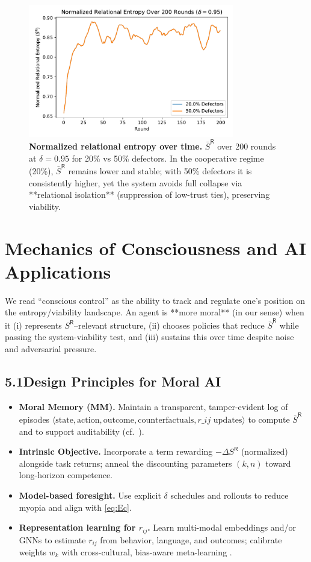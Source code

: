 \documentclass[11pt,a4paper]{article}
\begin{document}
\begin{figure}[t]
  \centering
  \includegraphics[width=0.80\textwidth]{entropy_chart.pdf}
  \caption{\textbf{Normalized relational entropy over time.}
  $\bar S^{\mathsf{R}}$ over 200 rounds at $\delta{=}0.95$ for 20\% vs 50\% defectors. In the cooperative regime (20\%), $\bar S^{\mathsf{R}}$ remains lower and stable; with 50\% defectors it is consistently higher, yet the system avoids full collapse via **relational isolation** (suppression of low-trust ties), preserving viability.}
  \label{fig:sr_over_time}
\end{figure}

\section{Mechanics of Consciousness and AI Applications}
We read “conscious control” as the ability to track and regulate one’s position on the entropy/viability landscape. An agent is **more moral** (in our sense) when it (i) represents $S^{\mathsf{R}}$–relevant structure, (ii) chooses policies that reduce $\bar S^{\mathsf{R}}$ while passing the system-viability test, and (iii) sustains this over time despite noise and adversarial pressure.

\subsection*{5.1\quad Design Principles for Moral AI}
\begin{itemize}
  \item \textbf{Moral Memory (MM).} Maintain a transparent, tamper-evident log of episodes \(\langle \text{state}, \text{action}, \text{outcome}, \text{counterfactuals}, r\_{ij}\text{ updates}\rangle\) to compute $\bar S^{\mathsf{R}}$ and to support auditability (cf.\ \cite{Amodei2016,IEEE2020}).
  \item \textbf{Intrinsic Objective.} Incorporate a term rewarding \(-\Delta S^{\mathsf{R}}\) (normalized) alongside task returns; anneal the discounting parameters $(k,n)$ toward long-horizon competence.
  \item \textbf{Model-based foresight.} Use explicit $\delta$ schedules and rollouts to reduce myopia and align with \eqref{eq:Ec}.
  \item \textbf{Representation learning for \(r_{ij}\).} Learn multi-modal embeddings and/or GNNs to estimate $r_{ij}$ from behavior, language, and outcomes; calibrate weights $w_k$ with cross-cultural, bias-aware meta-learning \cite{Floridi2020,Russell2019}.
\end{itemize}
\end{document}
